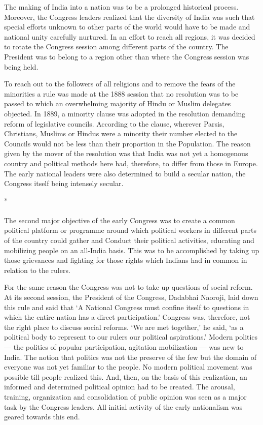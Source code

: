 The making of India into a nation was to be a prolonged historical process. Moreover, the Congress leaders realized that the diversity of India was such that special efforts unknown to other parts of the world would have to be made and national unity carefully nurtured. In an effort to reach all regions, it was decided to rotate the Congress session among different parts of the country. The President was to belong to a region other than where the Congress session was being held.

To reach out to the followers of all religions and to remove the fears of the minorities a rule was made at the 1888 session that no resolution was to be passed to which an overwhelming majority of Hindu or Muslim delegates objected. In 1889, a minority clause was adopted in the resolution demanding reform of legislative councils. According to the clause, wherever Parsis, Christians, Muslims or Hindus were a minority their number elected to the Councils would not be less than their proportion in the Population. The reason given by the mover of the resolution was that India was not yet a homogenous country and political methods here had, therefore, to differ from those in Europe. The early national leaders were also determined to build a secular nation, the Congress itself being intensely secular.

\begin{center}*\end{center}

\paragraph*{}

The second major objective of the early Congress was to create a common political platform or programme around which political workers in different parts of the country could gather and Conduct their political activities, educating and mobilizing people on an all-India basis. This was to be accomplished by taking up those grievances and fighting for those rights which Indians had in common in relation to the rulers.

For the same reason the Congress was not to take up questions of social reform. At its second session, the President of the Congress, Dadabhai Naoroji, laid down this rule and said that `A National Congress must confine itself to questions in which the entire nation has a direct participation.' Congress was, therefore, not the right place to discuss social reforms. `We are met together,' he said, `as a political body to represent to our rulers our political aspirations.' Modern politics --- the politics of popular participation, agitation mobilization --- was new to India. The notion that politics was not the preserve of the few but the domain of everyone was not yet familiar to the people. No modern political movement was possible till people realized this. And, then, on the basis of this realization, an informed and determined political opinion had to be created. The arousal, training, organization and consolidation of public opinion was seen as a major task by the Congress leaders. All initial activity of the early nationalism was geared towards this end.

